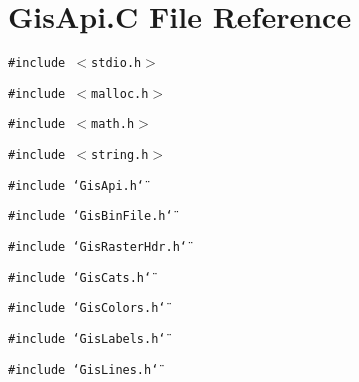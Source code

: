 \hypertarget{GisApi_8C}{
\section{Gis\-Api.C File Reference}
\label{GisApi_8C}
}
{\tt \#include $<$stdio.h$>$}\par
{\tt \#include $<$malloc.h$>$}\par
{\tt \#include $<$math.h$>$}\par
{\tt \#include $<$string.h$>$}\par
{\tt \#include \char`\"{}Gis\-Api.h\char`\"{}}\par
{\tt \#include \char`\"{}Gis\-Bin\-File.h\char`\"{}}\par
{\tt \#include \char`\"{}Gis\-Raster\-Hdr.h\char`\"{}}\par
{\tt \#include \char`\"{}Gis\-Cats.h\char`\"{}}\par
{\tt \#include \char`\"{}Gis\-Colors.h\char`\"{}}\par
{\tt \#include \char`\"{}Gis\-Labels.h\char`\"{}}\par
{\tt \#include \char`\"{}Gis\-Lines.h\char`\"{}}\par
